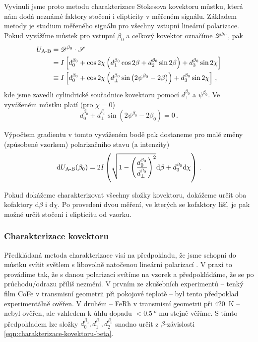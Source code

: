 Vyvinuli jsme proto metodu charakterizace Stokesova kovektoru můstku, která nám dodá neznámé faktory stočení i elipticity v měřeném signálu.
Základem metody je studium měřeného signálu pro všechny vstupní lineární polarizace.
Pokud vyvážíme můstek pro vstupní $\beta_0$ a celkový kovektor označíme $\mathscr{D}^{\beta_0}$, pak
\begin{equation}
\label{eqn:charakterizace-kovektoru-beta}
\begin{split}
    U_\textrm{A-B} &= \mathscr{D}^{\beta_0} \cdot \mathscr{S} \\ &= I \left[d^{\beta_0}_0+ \cos2\chi\left(d^{\beta_0}_1 \cos2\beta + d^{\beta_0}_2 \sin2\beta  \right) + d^{\beta_0}_3 \sin2\chi  \right] \\
          &\equiv I \left[ d^{\beta_0}_0+ \cos2\chi \left(d^{\beta_0}_\perp \sin \left( 2\psi^{\beta_0} - 2\beta \right) \right) + d^{\beta_0}_3 \sin2\chi \right] \,,
\end{split}
\end{equation}
kde jsme zavedli cylindrické souřadnice kovektoru pomocí $d^{\beta_0}_\perp$ a $\psi^{\beta_0}$.
Ve vyváženém můstku platí (pro $\chi=0$)
\begin{equation}
    d^{\beta_0}_0 + d^{\beta_0}_\perp \sin \left( 2\psi^{\beta_0} - 2\beta_0 \right) = 0 \,.
\end{equation}

Výpočtem gradientu v tomto vyváženém bodě pak dostaneme pro malé změny (způsobené vzorkem) polarizačního stavu (a intenzity)
\begin{equation}
    \textrm{d}U_\textrm{A-B}(\beta_0) = 2I \left(\sqrt{1 - \left(\frac{d^{\beta_0}_0}{d^{\beta_0}_\perp}\right)^2} \textrm{d}\beta + d^{\beta_0}_3 \textrm{d}\chi  \right) \,.
\end{equation}

Pokud dokážeme charakterizovat všechny složky kovektoru, dokážeme určit oba kofaktory $\textrm{d}\beta$ i $\textrm{d}\chi$.
Po provedení dvou měření, ve kterých se kofaktory liší, je pak možné určit stočení i elipticitu od vzorku.

\subsubsection*{Charakterizace kovektoru}

Předkládaná metoda charakterizace visí na předpokladu, že jsme schopni do můstku svítit světlem s libovolně natočenou lineární polarizací \beta.
V praxi to provádíme tak, že s danou polarizací svítíme na vzorek a předpokládáme, že se po průchodu/odrazu příliš nezmění.
V prvním ze zkušebních experimentů -- tenký film CoFe v transmisní geometrii při pokojové teplotě -- byl tento předpoklad experimentálně ověřen.
V druhém -- FeRh v transmisní geometrii při \SI{420}{\kelvin} -- nebyl ověřen, ale vzhledem k úhlu dopadu $<\SI{0.5}{\degree}$ mu stejně věříme.
S tímto předpokladem lze složky $d^{\beta_0}_0, d^{\beta_0}_1, d^{\beta_0}_2$ snadno určit z $\beta$-závislosti \eqref{eqn:charakterizace-kovektoru-beta}.


